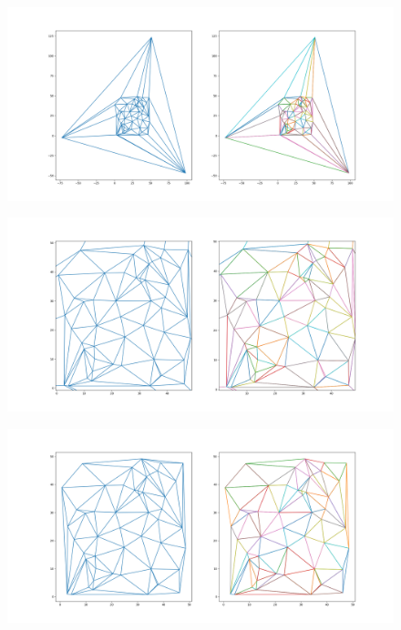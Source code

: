\documentclass[a4paper]{article}
\begin{document}
\begin{figure}[H]
	\centering
	\includegraphics[width=1.0\textwidth]{./imgs/ex1_not_convex_outer.png}
	\label{fig:heuristic1_50pts_refined} 
	\caption[caption]{}
\end{figure}

\begin{figure}[H]
	\centering
	\includegraphics[width=1.0\textwidth]{./imgs/ex1_not_convex_outer_zoom.png}
	\label{fig:heuristic1_100pts_refined} 
	\caption[caption]{}
\end{figure}



\begin{figure}[H]
	\centering
	\includegraphics[width=1.0\textwidth]{./imgs/ex1_not_convex.png}
	\label{fig:heuristic1_100pts_refined} 
	\caption[caption]{}
\end{figure}
\end{document}
